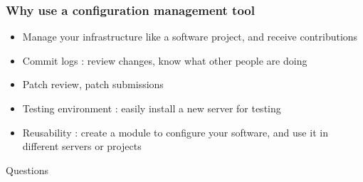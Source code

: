 \documentclass{beamer}
\begin{document}
\begin{frame}
  \frametitle{Why use a configuration management tool}

  \begin{itemize}
    \item Manage your infrastructure like a software project, and receive
          contributions
    \item Commit logs : review changes, know what other people are doing
    \item Patch review, patch submissions
    \item Testing environment : easily install a new server for testing
    \item Reusability : create a module to configure your software, and use
          it in different servers or projects
  \end{itemize}
\end{frame}

\begin{frame}
  \begin{center}
    Questions
  \end{center}
\end{frame}
\end{document}
